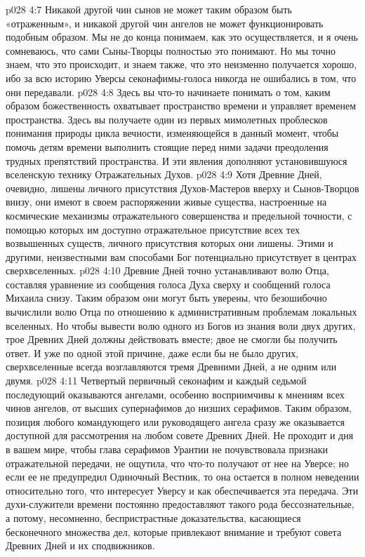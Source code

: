\vs p028 4:7 Никакой другой чин сынов не может таким образом быть «отраженным», и никакой другой чин ангелов не может функционировать подобным образом. Мы не до конца понимаем, как это осуществляется, и я очень сомневаюсь, что сами Сыны\hyp{}Творцы полностью это понимают. Но мы точно знаем, что это происходит, и знаем также, что это неизменно получается хорошо, ибо за всю историю Уверсы секонафимы\hyp{}голоса никогда не ошибались в том, что они передавали.
\vs p028 4:8 Здесь вы что\hyp{}то начинаете понимать о том, каким образом божественность охватывает пространство времени и управляет временем пространства. Здесь вы получаете один из первых мимолетных проблесков понимания природы цикла вечности, изменяющейся в данный момент, чтобы помочь детям времени выполнить стоящие перед ними задачи преодоления трудных препятствий пространства. И эти явления дополняют установившуюся вселенскую технику Отражательных Духов.
\vs p028 4:9 Хотя Древние Дней, очевидно, лишены личного присутствия Духов\hyp{}Мастеров вверху и Сынов\hyp{}Творцов внизу, они имеют в своем распоряжении живые существа, настроенные на космические механизмы отражательного совершенства и предельной точности, с помощью которых им доступно отражательное присутствие всех тех возвышенных существ, личного присутствия которых они лишены. Этими и другими, неизвестными вам способами Бог потенциально присутствует в центрах сверхвселенных.
\vs p028 4:10 Древние Дней точно устанавливают волю Отца, составляя уравнение из сообщения голоса Духа сверху и сообщений голоса Михаила снизу. Таким образом они могут быть уверены, что безошибочно вычислили волю Отца по отношению к административным проблемам локальных вселенных. Но чтобы вывести волю одного из Богов из знания воли двух других, трое Древних Дней должны действовать вместе; двое не смогли бы получить ответ. И уже по одной этой причине, даже если бы не было других, сверхвселенные всегда возглавляются тремя Древними Дней, а не одним или двумя.
\vs p028 4:11 \bibnobreakspace {} Четвертый первичный секонафим и каждый седьмой последующий оказываются ангелами, особенно восприимчивы к мнениям всех чинов ангелов, от высших супернафимов до низших серафимов. Таким образом, позиция любого командующего или руководящего ангела сразу же оказывается доступной для рассмотрения на любом совете Древних Дней. Не проходит и дня в вашем мире, чтобы глава серафимов Урантии не почувствовала признаки отражательной передачи, не ощутила, что что\hyp{}то получают от нее на Уверсе; но если ее не предупредил Одиночный Вестник, то она остается в полном неведении относительно того, что интересует Уверсу и как обеспечивается эта передача. Эти духи\hyp{}служители времени постоянно предоставляют такого рода бессознательные, а потому, несомненно, беспристрастные доказательства, касающиеся бесконечного множества дел, которые привлекают внимание и требуют совета Древних Дней и их сподвижников.
